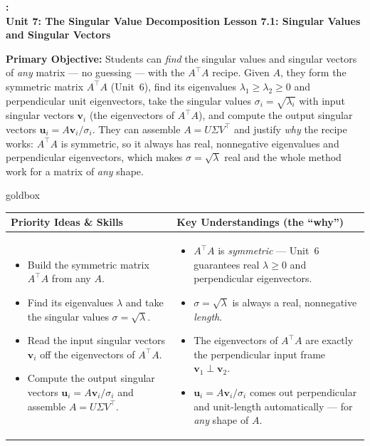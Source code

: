\documentclass[10pt]{article}
\newcommand{\uu}{\mathbf{u}}
\newcommand{\vv}{\mathbf{v}}
\newcommand{\T}{^{\top}}
\newcommand{\UnitNumberName}{Unit 7: The Singular Value Decomposition \quad}
\newcommand{\LessonNumberName}{Lesson 7.1: Singular Values and Singular Vectors}
\begin{document}
\begin{center}
    {\Large\bfseries \CourseName: \SchoolYear \\
    {\small\bfseries \UnitNumberName \LessonNumberName}}
\end{center}

\begin{tcolorbox}[colback=blush, colframe=burgundy, boxrule=0.9pt, arc=2mm,
    left=2mm, right=2mm, top=1.5mm, bottom=1.5mm]
    \textbf{Primary Objective:} Students can \emph{find} the singular values and singular vectors of
    \emph{any} matrix --- no guessing --- with the $A\T A$ recipe. Given $A$, they form the symmetric
    matrix $A\T A$ (Unit~6), find its eigenvalues $\lambda_1\ge\lambda_2\ge0$ and perpendicular unit
    eigenvectors, take the singular values $\sigma_i=\sqrt{\lambda_i}$ with input singular vectors
    $\vv_i$ (the eigenvectors of $A\T A$), and compute the output singular vectors $\uu_i=A\vv_i/\sigma_i$.
    They can assemble $A=U\Sigma V\T$ and justify \emph{why} the recipe works: $A\T A$ is symmetric, so
    it always has real, nonnegative eigenvalues and perpendicular eigenvectors, which makes
    $\sigma=\sqrt{\lambda}$ real and the whole method work for a matrix of \emph{any} shape.
\end{tcolorbox}

\renewcommand{\arraystretch}{1.4}
\begin{skillbox}{goldbox}
\begin{tabularx}{\linewidth}{@{}X|X@{}}
\textbf{Priority Ideas \& Skills} & \textbf{Key Understandings (the ``why'')} \\[2pt]
\hline
\vspace{-6pt}
\begin{itemize}[leftmargin=1.1em, nosep, after=\vspace{2pt}]
  \item Build the symmetric matrix $A\T A$ from any $A$.
  \item Find its eigenvalues $\lambda$ and take the singular values $\sigma=\sqrt{\lambda}$.
  \item Read the input singular vectors $\vv_i$ off the eigenvectors of $A\T A$.
  \item Compute the output singular vectors $\uu_i=A\vv_i/\sigma_i$ and assemble $A=U\Sigma V\T$.
\end{itemize}
&
\vspace{-6pt}
\begin{itemize}[leftmargin=1.1em, nosep, after=\vspace{2pt}]
  \item $A\T A$ is \emph{symmetric} --- Unit~6 guarantees real $\lambda\ge0$ and perpendicular eigenvectors.
  \item $\sigma=\sqrt{\lambda}$ is always a real, nonnegative \emph{length}.
  \item The eigenvectors of $A\T A$ are exactly the perpendicular input frame $\vv_1\perp\vv_2$.
  \item $\uu_i=A\vv_i/\sigma_i$ comes out perpendicular and unit-length automatically --- for \emph{any} shape of $A$.
\end{itemize}
\end{tabularx}
\end{skillbox}
\end{document}
